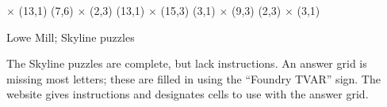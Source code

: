 \documentclass{puzzlehunt}
\begin{document}
   \(\times\) (13,1)
  \hspace*{\fill}
  (7,6) \(\times\) (2,3)
  \hspace*{\fill}
  (13,1) \(\times\) (15,3)
  \hspace*{\fill}
  (3,1) \(\times\) (9,3)
  \hspace*{\fill}
  (2,3) \(\times\) (3,1)

\vfill\vfill






  Lowe Mill; Skyline puzzles

  The Skyline puzzles are complete, but lack instructions. An answer grid
  is missing most letters; these are filled in using the ``Foundry TVAR''
  sign. The website gives instructions and designates cells to use with the
  answer grid.










  \newcommand{\escapePodTournamentSquare}{%
    \begin{tikzpicture}\draw (0,0) circle [radius=0.6em];\end{tikzpicture}%
  }
  \newcommand{\escapePodTournament}[8]{
    \begin{tabular}{c}
    \begin{tikzpicture}
      \tikzset{edge from parent/.style=
      {draw,
      edge from parent path={(\tikzparentnode.south)
      -- +(0,-8pt)
      -| (\tikzchildnode)}}}
    \Tree
      [.\escapePodTournamentSquare{}
        [.\escapePodTournamentSquare{}
          [.\escapePodTournamentSquare{}
            #1
            #2
          ]
          [.\escapePodTournamentSquare{}
            #3
            #4
          ]
        ]
        [.\escapePodTournamentSquare{}
          [.\escapePodTournamentSquare{}
            #5
            #6
          ]
          #7
        ]
      ]
    \end{tikzpicture} \\
    \textbf{#8} \vspace{1em}
    \end{tabular}
  }
\end{document}
